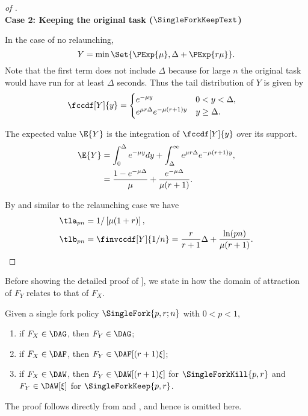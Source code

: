 \begin{proof}[of ]
~\\
\textbf{Case 2: Keeping the original task ($\SingleForkKeepText$)}
\label{sec:shifted_exp_no_relaunching}

In the case of no relaunching,
\[Y = \min\Set{\PExp{\mu}, \Delta + \PExp{r\mu}}.\]
Note that the first term does not include $\Delta$ because for large $n$ the original task would have run for at least $\Delta$ seconds. Thus the tail distribution of $Y$ is given by
\begin{align}
    \label{eqn:shifted_exp_Y}
    \fccdf[Y]{y} &= \begin{cases}
        e^{-\mu y} & 0 < y < \Delta, \\
        e^{\mu r \Delta} e^{-\mu(r+1)y} & y \geq \Delta.
    \end{cases}
\end{align}

The expected value $\E{Y}$ is the integration of $\fccdf[Y]{y}$ over its support.
\begin{align*}
\E{Y} &= \int_{0}^{\Delta} e^{-\mu y} dy + \int_{\Delta}^{\infty} e^{\mu r \Delta} e^{-\mu(r+1)y}, \\
&= \frac{1- e^{-\mu \Delta}}{\mu} + \frac{e^{-\mu \Delta}}{ \mu (r+1)} .
\end{align*}

By  and  similar to the relaunching case we have
\begin{align*}
    \tla_{pn} &= 1/\left[ \mu(1+r) \right], \\
    \tlb_{pn} &= \finvccdf[Y]{1/n} = \frac{r}{r+1} \Delta + \frac{\ln (pn) }{\mu(r+1)}.
\end{align*}
\end{proof}



Before showing the detailed proof of ], 
we state in  how the domain of attraction of $F_Y$ relates to that of $F_X$. 

\begin{lem}
    \label{lem:DA_FY}
    Given a single fork policy $\SingleFork{p,r; n}$ with $0 < p < 1$, 
    \begin{enumerate}
        \item if $F_X \in \DAG$, then $F_Y \in \DAG$;
        \item if $F_X \in \DAF$, then $F_Y \in \DAF[(r+1)\xi]$;
        \item if $F_X \in \DAW$, then $F_Y \in \DAW[(r+1)\xi]$ for $\SingleForkKill{p,r}$ and $F_Y \in \DAW[\xi]$ for $\SingleForkKeep{p,r}$.
    \end{enumerate}
\end{lem}
The proof follows directly from  and , and hence is omitted here. 



